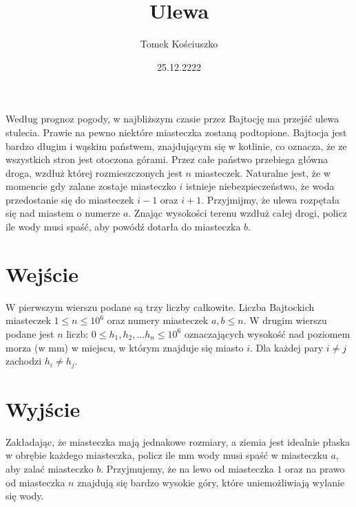 \documentclass[zad,zawodnik,utf8]{sinol}
\title{Ulewa}
\author{Tomek Kościuszko}
\date{25.12.2222}
\begin{document}
\begin{tasktext}%
    Według prognoz pogody, w najbliższym czasie przez Bajtocję ma przejść ulewa stulecia. Prawie na pewno niektóre miasteczka zostaną podtopione. Bajtocja jest bardzo długim i wąskim państwem, znajdującym się w kotlinie, co oznacza, że ze wszystkich stron jest otoczona górami. Przez całe państwo przebiega główna droga, wzdłuż której rozmieszczonych jest $n$ miasteczek. Naturalne jest, że w momencie gdy zalane zostaje miasteczko $i$ istnieje niebezpieczeństwo, że woda przedostanie się do miasteczek $i - 1$ oraz $i + 1$. Przyjmijmy, że ulewa rozpętała się nad miastem o numerze $a$. Znając wysokości terenu wzdłuż całej drogi, policz ile wody musi spaść, aby powódź dotarła do miasteczka $b$.

\section{Wejście}
    W pierwszym wierszu podane są trzy liczby całkowite. Liczba Bajtockich miasteczek $1 \leq n \leq 10^6$ oraz numery miasteczek $a, b\leq n$.
    W drugim wierszu podane jest $n$ liczb: $0 \leq h_{1}, h_{2}, ... h_{n} \leq 10^6$ oznaczających wysokość nad poziomem morza (w mm) w miejscu, w którym znajduje się miasto $i$. Dla każdej pary $i \neq j$ zachodzi $h_{i} \neq h_{j}$.

\section{Wyjście}
    Zakładając, że miasteczka mają jednakowe rozmiary, a ziemia jest idealnie płaska w obrębie każdego miasteczka, policz ile mm wody musi spaść w miasteczku $a$, aby zalać miasteczko $b$.
    Przyjmujemy, że na lewo od miasteczka $1$ oraz na prawo od miasteczka $n$ znajdują się bardzo wysokie góry, które uniemożliwiają wylanie się wody.




\end{tasktext}
\end{document}
